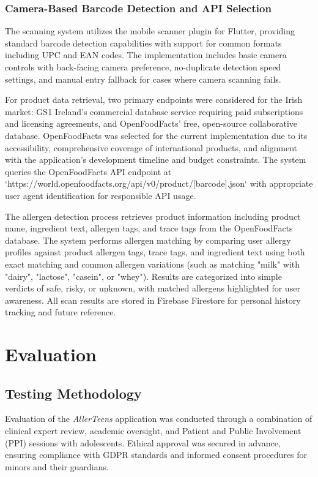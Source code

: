 \documentclass[MScCS]{uccthesis}
\begin{document}
\subsection{Camera-Based Barcode Detection and API Selection}

The scanning system utilizes the mobile scanner plugin for Flutter, providing standard barcode detection capabilities with support for common formats including UPC and EAN codes. The implementation includes basic camera controls with back-facing camera preference, no-duplicate detection speed settings, and manual entry fallback for cases where camera scanning fails.

For product data retrieval, two primary endpoints were considered for the Irish market: GS1 Ireland's commercial database service requiring paid subscriptions and licensing agreements, and OpenFoodFacts' free, open-source collaborative database. OpenFoodFacts was selected for the current implementation due to its accessibility, comprehensive coverage of international products, and alignment with the application's development timeline and budget constraints. The system queries the OpenFoodFacts API endpoint at `https://world.openfoodfacts.org/api/v0/product/[barcode].json` with appropriate user agent identification for responsible API usage.

The allergen detection process retrieves product information including product name, ingredient text, allergen tags, and trace tags from the OpenFoodFacts database. The system performs allergen matching by comparing user allergy profiles against product allergen tags, trace tags, and ingredient text using both exact matching and common allergen variations (such as matching "milk" with "dairy", "lactose", "casein", or "whey"). Results are categorized into simple verdicts of safe, risky, or unknown, with matched allergens highlighted for user awareness. All scan results are stored in Firebase Firestore for personal history tracking and future reference.






\clearpage

\chapter{Evaluation}
\label{chap:evaluation}

\section{Testing Methodology}
Evaluation of the \textit{AllerTeens} application was conducted through a combination of clinical expert review, academic oversight, and Patient and Public Involvement (PPI) sessions with adolescents. Ethical approval was secured in advance, ensuring compliance with GDPR standards and informed consent procedures for minors and their guardians.  
\end{document}
